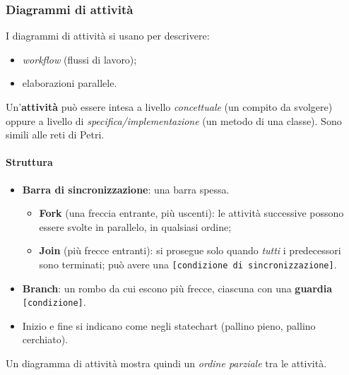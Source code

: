 \documentclass[a4paper,12pt]{article}
\begin{document}
\subsubsection{Diagrammi di attività}
I diagrammi di attività si usano per descrivere:
\begin{itemize}
  \item \emph{workflow} (flussi di lavoro);
  \item elaborazioni parallele.
\end{itemize}
Un'\textbf{attività} può essere intesa a livello \emph{concettuale} (un compito da
svolgere) oppure a livello di \emph{specifica/implementazione} (un metodo di una classe).
Sono simili alle reti di Petri.

\paragraph{Struttura}
\begin{itemize}
  \item \textbf{Barra di sincronizzazione}: una barra spessa.
  \begin{itemize}
    \item \textbf{Fork} (una freccia entrante, più uscenti): le attività successive
          possono essere svolte in parallelo, in qualsiasi ordine;
    \item \textbf{Join} (più frecce entranti): si prosegue solo quando \emph{tutti}
          i predecessori sono terminati; può avere una
          \texttt{[condizione di sincronizzazione]}.
  \end{itemize}
  \item \textbf{Branch}: un rombo da cui escono più frecce, ciascuna con una
        \textbf{guardia} \texttt{[condizione]}.
  \item Inizio e fine si indicano come negli statechart (pallino pieno, pallino
        cerchiato).
\end{itemize}
Un diagramma di attività mostra quindi un \emph{ordine parziale} tra le attività.
\end{document}
